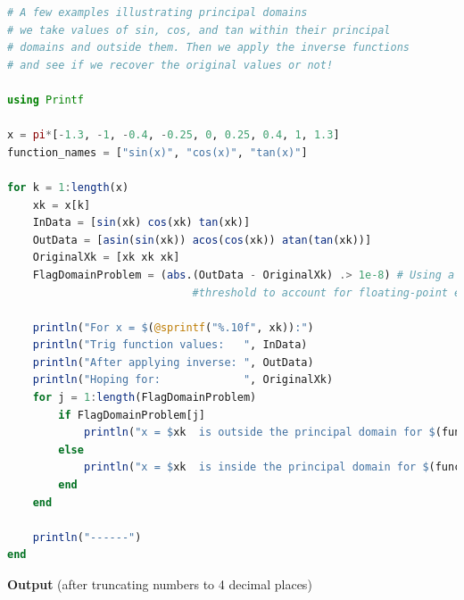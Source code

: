 \bigskip

\bigskip
\begin{lstlisting}[language=Julia,style=mystyle]
# A few examples illustrating principal domains
# we take values of sin, cos, and tan within their principal 
# domains and outside them. Then we apply the inverse functions
# and see if we recover the original values or not!

using Printf

x = pi*[-1.3, -1, -0.4, -0.25, 0, 0.25, 0.4, 1, 1.3]
function_names = ["sin(x)", "cos(x)", "tan(x)"]

for k = 1:length(x)
    xk = x[k]
    InData = [sin(xk) cos(xk) tan(xk)]
    OutData = [asin(sin(xk)) acos(cos(xk)) atan(tan(xk))]
    OriginalXk = [xk xk xk]
    FlagDomainProblem = (abs.(OutData - OriginalXk) .> 1e-8) # Using a small 
                             #threshold to account for floating-point errors
    
    println("For x = $(@sprintf("%.10f", xk)):")
    println("Trig function values:   ", InData)
    println("After applying inverse: ", OutData)
    println("Hoping for:             ", OriginalXk)
    for j = 1:length(FlagDomainProblem)
        if FlagDomainProblem[j]
            println("x = $xk  is outside the principal domain for $(function_names[j]) .")
        else
            println("x = $xk  is inside the principal domain for $(function_names[j]) .")
        end
    end

    println("------")
end

\end{lstlisting}
\textbf{Output} (after truncating numbers to 4 decimal places)
